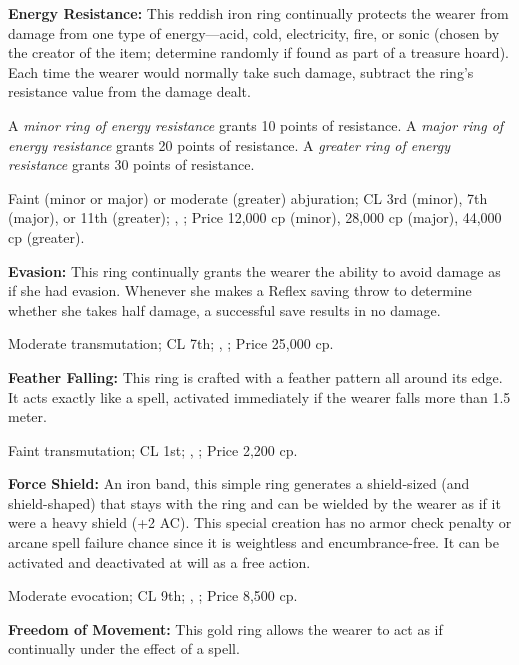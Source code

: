 

\textbf{Energy Resistance:} This reddish iron ring continually protects the wearer from damage from one type of energy---acid, cold, electricity, fire, or sonic (chosen by the creator of the item; determine randomly if found as part of a treasure hoard). Each time the wearer would normally take such damage, subtract the ring's resistance value from the damage dealt.

A \emph{minor ring of energy resistance} grants 10 points of resistance. A \emph{major ring of energy resistance} grants 20 points of resistance. A \emph{greater ring of energy resistance} grants 30 points of resistance.

Faint (minor or major) or moderate (greater) abjuration; CL 3rd (minor), 7th (major), or 11th (greater); , ; Price 12,000 cp (minor), 28,000 cp (major), 44,000 cp (greater).

\textbf{Evasion:} This ring continually grants the wearer the ability to avoid damage as if she had evasion. Whenever she makes a Reflex saving throw to determine whether she takes half damage, a successful save results in no damage.

Moderate transmutation; CL 7th; , ; Price 25,000 cp.

\textbf{Feather Falling:} This ring is crafted with a feather pattern all around its edge. It acts exactly like a  spell, activated immediately if the wearer falls more than 1.5 meter.

Faint transmutation; CL 1st; , ; Price 2,200 cp.

\textbf{Force Shield:} An iron band, this simple ring generates a shield-sized (and shield-shaped)  that stays with the ring and can be wielded by the wearer as if it were a heavy shield (+2 AC). This special creation has no armor check penalty or arcane spell failure chance since it is weightless and encumbrance-free. It can be activated and deactivated at will as a free action.

Moderate evocation; CL 9th; , ; Price 8,500 cp.

\textbf{Freedom of Movement:} This gold ring allows the wearer to act as if continually under the effect of a  spell.

